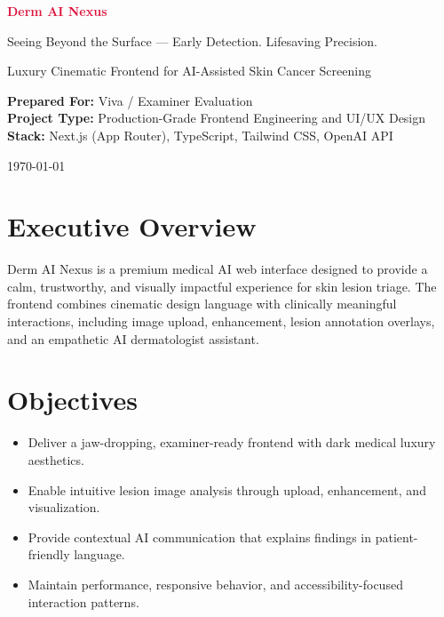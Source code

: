 \documentclass[12pt,a4paper]{article}
\begin{document}
\begin{titlepage}
    \centering
    \vspace*{2.4cm}
    {\Huge\bfseries\textcolor{crimson}{Derm AI Nexus}\par}
    \vspace{0.8cm}
    {\Large\textcolor{softwhite}{Seeing Beyond the Surface --- Early Detection. Lifesaving Precision.}\par}
    \vspace{1.6cm}
    {\large\textcolor{trustcyan}{Luxury Cinematic Frontend for AI-Assisted Skin Cancer Screening}\par}
    \vfill
    \begin{tcolorbox}[colback=richblack,colframe=crimson,boxrule=0.8pt,width=0.85\textwidth]
    \centering
    \textbf{Prepared For:} Viva / Examiner Evaluation \\
    \textbf{Project Type:} Production-Grade Frontend Engineering and UI/UX Design \\
    \textbf{Stack:} Next.js (App Router), TypeScript, Tailwind CSS, OpenAI API
    \end{tcolorbox}
    \vfill
    {\large \today \par}
\end{titlepage}

\tableofcontents
\newpage

\section{Executive Overview}
Derm AI Nexus is a premium medical AI web interface designed to provide a calm, trustworthy, and visually impactful experience for skin lesion triage. The frontend combines cinematic design language with clinically meaningful interactions, including image upload, enhancement, lesion annotation overlays, and an empathetic AI dermatologist assistant.

\section{Objectives}
\begin{itemize}[leftmargin=1.5em]
    \item Deliver a jaw-dropping, examiner-ready frontend with dark medical luxury aesthetics.
    \item Enable intuitive lesion image analysis through upload, enhancement, and visualization.
    \item Provide contextual AI communication that explains findings in patient-friendly language.
    \item Maintain performance, responsive behavior, and accessibility-focused interaction patterns.
\end{itemize}
\end{document}
